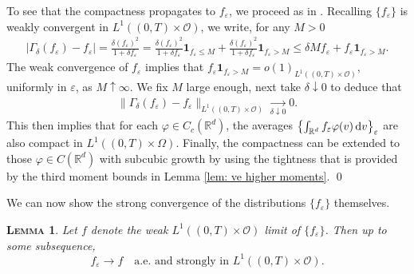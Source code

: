 \documentclass[10pt, reqno]{amsart}
\theoremstyle{plain}
\newtheorem{lemma}[theorem]{\normalfont \scshape Lemma}
\theoremstyle{definition}
\theoremstyle{remark}
\renewenvironment{proof}[1][\proofname]{\noindent{\scshape #1.\quad}}{\qed}
\numberwithin{equation}{section}
\newcommand{\calO}{\mathcal O}
\newcommand{\R}{\mathbb{R}}
\newcommand{\ve}{\varepsilon}
\newcommand{\dv}{\textnormal{d}v}
\newcommand{\lt}{\left}
\newcommand{\rt}{\right}
\newcommand{\intr}{\int_{\R^d}}
\begin{document}
\begin{proof}
To see that the compactness propagates to $f_\ve$, we proceed as in \cite{GolseSaintRaymond05}. Recalling $\{f_\ve\}$ is weakly convergent in $L^1((0,T)\times \calO)$, we write, for any $M>0$
\begin{align*}
    |\Gamma_\delta(f_\ve) - f_\ve| = \frac{\delta (f_\ve)^2}{1+\delta f_\ve}  = \frac{\delta (f_\ve)^2}{1+\delta f_\ve}\mathbf{1}_{f_\ve \le M} + \frac{\delta (f_\ve)^2}{1+\delta f_\ve} \mathbf{1}_{f_\ve > M}  \le \delta M f_\ve + f_\ve \mathbf{1}_{f_\ve > M}.
\end{align*}
The weak convergence of $f_\ve$ implies that $f_\ve \mathbf{1}_{f_\ve > M} = o(1)_{L^1((0,T)\times \calO)}$, uniformly in $\ve$, as $M\uparrow \infty$. We fix $M$ large enough, next take $\delta\downarrow 0$ to deduce that
\begin{align*}
    \|\Gamma_\delta (f_\ve) - f_\ve \|_{L^1((0,T)\times \calO)} \xrightarrow[\delta\downarrow 0]{} 0.
\end{align*}
This then implies that for each $\varphi\in C_c(\R^d)$, the averages $\lt\{\intr f_\ve \varphi(v)\,\dv\rt\}_\ve$ are also compact in $L^1((0,T)\times\Omega)$. Finally, the compactness can be extended to those $\varphi\in C(\R^d)$ with subcubic growth by using the tightness that is provided by the third moment bounds in Lemma \ref{lem: ve higher moments}.
\end{proof}

We can now show the strong convergence of the distributions $\{f_\ve\}$ themselves.

\begin{lemma}\label{lem: ptw}
    Let $f$ denote the weak $L^1((0,T)\times \calO)$ limit of $\{f_\ve\}$. Then up to some subsequence,
\[
        f_\ve \to f \quad \text{a.e. and strongly in }L^1((0,T)\times \calO).
\]
\end{lemma}
\end{document}
